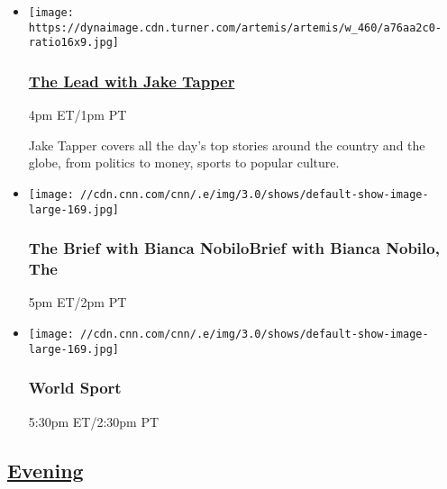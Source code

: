 \begin{itemize}
\item
  \href{/specials/tv/all-shows}{}

  \texttt{[image: https://dynaimage.cdn.turner.com/artemis/artemis/w\_460/a76aa2c0-ratio16x9.jpg]}

  \hypertarget{the-lead-with-jake-tapper-3}{%
  \subsubsection{\texorpdfstring{\href{/specials/tv/all-shows}{The Lead
  with Jake
  Tapper}}{The Lead with Jake Tapper}}\label{the-lead-with-jake-tapper-3}}

  4pm ET/1pm PT

  Jake Tapper covers all the day's top stories around the country and
  the globe, from politics to money, sports to popular culture.
\end{itemize}

\begin{itemize}
\item
  \texttt{[image: //cdn.cnn.com/cnn/.e/img/3.0/shows/default-show-image-large-169.jpg]}

  \hypertarget{the-brief-with-bianca-nobilobrief-with-bianca-nobilo-the--3}{%
  \subsubsection{The Brief with Bianca NobiloBrief with Bianca Nobilo,
  The
  }\label{the-brief-with-bianca-nobilobrief-with-bianca-nobilo-the--3}}

  5pm ET/2pm PT
\end{itemize}

\begin{itemize}
\item
  \texttt{[image: //cdn.cnn.com/cnn/.e/img/3.0/shows/default-show-image-large-169.jpg]}

  \hypertarget{world-sport-16}{%
  \subsubsection{World Sport}\label{world-sport-16}}

  5:30pm ET/2:30pm PT
\end{itemize}

\hypertarget{evening--5}{%
\subsection{\texorpdfstring{\href{/tv/schedule/cnn/index.html}{Evening}~}{Evening~}}\label{evening--5}}

